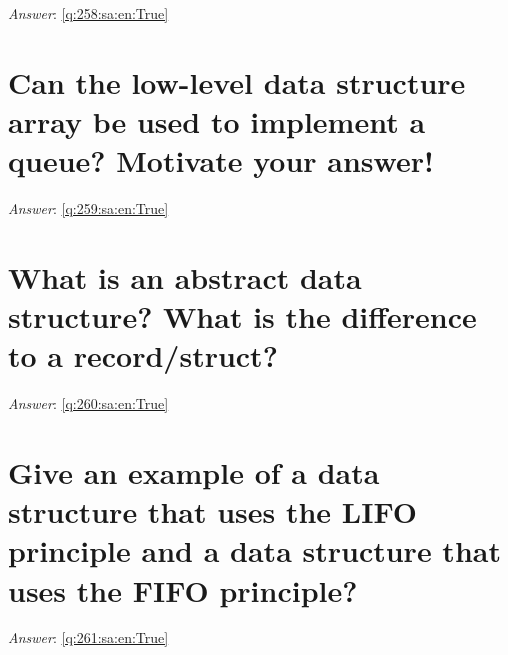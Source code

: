 \documentclass[a4paper,11pt,oneside]{book}
\begin{document}
\begin{sloppypar}
\noindent\makebox[\textwidth]{\hrulefill}

\vspace{1cm}

\textit{Answer}: \autoref{q:258:sa:en:True}



\section{Can the low-level data structure array be used to implement a queue? Motivate your answer!}

\label{q:259:sa:en:False}

\vspace{2cm}

\noindent\makebox[\textwidth]{\hrulefill}

\vspace{1cm}

\textit{Answer}: \autoref{q:259:sa:en:True}



\section{What is an abstract data structure? What is the difference to a record/struct?}

\label{q:260:sa:en:False}

\vspace{2cm}

\noindent\makebox[\textwidth]{\hrulefill}

\vspace{1cm}

\textit{Answer}: \autoref{q:260:sa:en:True}



\section{Give an example of a data structure that uses the LIFO principle and a data structure that uses the FIFO principle?}

\label{q:261:sa:en:False}

\vspace{2cm}

\noindent\makebox[\textwidth]{\hrulefill}

\vspace{1cm}

\textit{Answer}: \autoref{q:261:sa:en:True}




\end{sloppypar}
\end{document}
